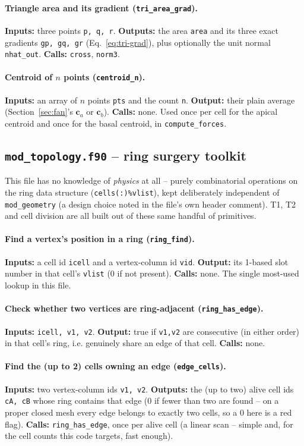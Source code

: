 \documentclass[11pt,a4paper]{report}
\newcommand{\ca}{\mathbf{c}_a}
\newcommand{\cb}{\mathbf{c}_b}
\begin{document}
\paragraph{Triangle area and its gradient (\texttt{tri\_area\_grad}).}
\textbf{Inputs:} three points \texttt{p, q, r}. \textbf{Outputs:} the
area \texttt{area} and its three exact gradients \texttt{gp, gq, gr}
(Eq.~\ref{eq:tri-grad}), plus optionally the unit normal
\texttt{nhat\_out}. \textbf{Calls:} \texttt{cross}, \texttt{norm3}.
\paragraph{Centroid of $n$ points (\texttt{centroid\_n}).}
\textbf{Inputs:} an array of $n$ points \texttt{pts} and the count
\texttt{n}. \textbf{Output:} their plain average (Section~\ref{sec:fan}'s
$\ca$ or $\cb$). \textbf{Calls:} none. Used once per cell for the
apical centroid and once for the basal centroid, in
\texttt{compute\_forces}.

\subsection{\texttt{mod\_topology.f90} -- ring surgery toolkit}
\label{sec:mod-topology}
This file has no knowledge of \emph{physics} at all -- purely
combinatorial operations on the ring data structure
(\texttt{cells(:)\%vlist}), kept deliberately independent of
\texttt{mod\_geometry} (a design choice noted in the file's own header
comment). T1, T2 and cell division are all built out of these same
handful of primitives.
\paragraph{Find a vertex's position in a ring (\texttt{ring\_find}).}
\textbf{Inputs:} a cell id \texttt{icell} and a vertex-column id
\texttt{vid}. \textbf{Output:} its 1-based slot number in that cell's
\texttt{vlist} (0 if not present). \textbf{Calls:} none. The single
most-used lookup in this file.
\paragraph{Check whether two vertices are ring-adjacent
(\texttt{ring\_has\_edge}).} \textbf{Inputs:} \texttt{icell, v1, v2}.
\textbf{Output:} true if \texttt{v1,v2} are consecutive (in either
order) in that cell's ring, i.e. genuinely share an edge of that cell.
\textbf{Calls:} none.
\paragraph{Find the (up to 2) cells owning an edge (\texttt{edge\_cells}).}
\textbf{Inputs:} two vertex-column ids \texttt{v1, v2}.
\textbf{Outputs:} the (up to two) alive cell ids \texttt{cA, cB} whose
ring contains that edge (0 if fewer than two are found -- on a proper
closed mesh every edge belongs to exactly two cells, so a 0 here is a
red flag). \textbf{Calls:} \texttt{ring\_has\_edge}, once per alive
cell (a linear scan -- simple and, for the cell counts this code
targets, fast enough).
\end{document}
